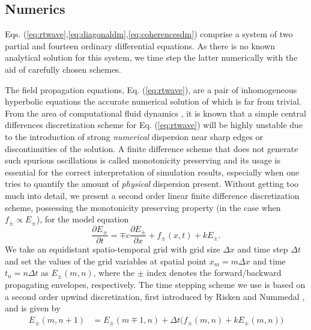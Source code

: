 \documentclass[twocolumn,secnumarabic,amssymb, nobibnotes, aps, prd]{revtex4-1}
\begin{document}
{			\begin{appendices}
				\section{Numerics}
				\label{sec:numerics}
				
				Eqs. (\ref{eq:rtwave},\ref{eq:diagonaldm},\ref{eq:coherencesdm}) comprise a system of two partial and fourteen ordinary differential equations. As there is no known analytical solution for this system, we time step the latter numerically with the aid of carefully chosen schemes. 
				
				The field propagation equations, Eq. (\ref{eq:rtwave}), are a pair of inhomogeneous hyperbolic equations the accurate numerical solution of which is far from trivial. From the area of computational fluid dynamics \cite{wesseling2009principles}, it is known that a simple central differences discretization scheme for Eq. (\ref{eq:rtwave}) will be highly unstable due to the introduction of strong \emph{numerical} dispersion near sharp edges or discontinuities of the solution. A finite difference scheme that does not generate such spurious oscillations is called monotonicity preserving \cite{wesseling2009principles} and its usage is essential for the correct interpretation of simulation results, especially when one tries to quantify the amount of \emph{physical} dispersion present. Without getting too much into detail, we present a second order linear finite difference discretization scheme, possessing the monotonicity preserving property (in the case when $f_\pm \propto E_\pm$),  for the model equation
				\begin{equation}
				\label{eq:genericwave}
				\frac{\partial E_{\pm}}{\partial t}  = \mp c\frac{\partial E_{\pm} }{\partial x} +f_{\pm}(x,t) + k E_{\pm}.
				\end{equation}
				We take an equidistant spatio-temporal grid with grid size $\Delta x$ and time step $\Delta t$ and set the values of the grid variables at spatial point $x_m=m \Delta x $  and time $t_n = n\Delta t$ as $E_{\pm}(m,n)$, where the $\pm$ index denotes the forward/backward propagating envelopes, respectively. The time stepping scheme we use is based on a second order upwind discretization, first introduced by Risken and Nummedal \cite{risken1968self}, and is given by
				\begin{align}
				\label{eq:riskennummedal}
				E_{\pm}(m,n+1) &= E_{\pm}(m \mp 1,n) + \Delta t \big ( f_{\pm}(m,n) +k E_{\pm}(m,n) \big ) \nonumber \\ 

\end{align}
\end{appendices}}
\end{document}

